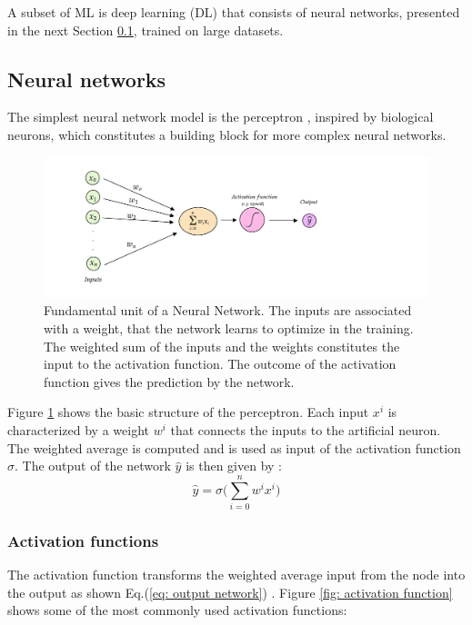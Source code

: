 A subset of ML is deep learning (DL) that consists of neural networks, presented in the next Section \ref{subsection: NN}, trained on large datasets.

\subsection{Neural networks} \label{subsection: NN}

The simplest neural network model is the perceptron \cite{perceptrons}, inspired by biological neurons, which constitutes a building block for more complex neural networks. 

\begin{figure}[hbt]
    \centering
    \includegraphics[width=0.8\linewidth]{Images/5.SPANet/NN diagram 2.pdf}
    \caption{Fundamental unit of a Neural Network. The inputs are associated with a weight, that the network learns to optimize in the training. The weighted sum of the inputs and the weights constitutes the input to the activation function. The outcome of the activation function gives the prediction by the network.}
    \label{fig: neuron}
\end{figure}

Figure \ref{fig: neuron} shows the basic structure of the perceptron. Each input $x^i$ is characterized by a weight $w^i$ that connects the inputs to the artificial neuron. The weighted average is computed and is used as input of the activation function $\sigma$. The output of the network $\hat{y}$ is then given by \cite{neutrinoslides}:
\begin{equation}
    \hat{y}=\sigma\bigg(\sum_{i=0}^n w^i x^i\bigg)
    \label{eq: output network}
\end{equation}

\subsubsection{Activation functions}
The activation function transforms the weighted average input from the node into the output as shown Eq.(\ref{eq: output network}) \cite{ACTIVATION_FUNCTION}. Figure \ref{fig: activation function} shows some of the most commonly used activation functions:

